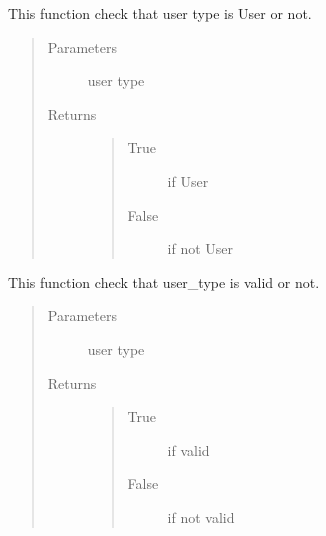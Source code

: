 \documentclass[letterpaper,10pt,english]{sphinxmanual}
\begin{document}

\begin{fulllineitems}
\label{\detokenize{janta:janta.viewhelper.is_user}}
This function check that user type is User or not.
\begin{quote}\begin{description}
\item[{Parameters}] \leavevmode
{} \textendash{} user type

\item[{Returns}] \leavevmode
\begin{quote}\begin{description}
\item[{True}] \leavevmode
if User

\item[{False}] \leavevmode
if not User

\end{description}\end{quote}


\end{description}\end{quote}

\end{fulllineitems}


\begin{fulllineitems}
\label{\detokenize{janta:janta.viewhelper.is_user_type}}
This function check that user\_type is valid or not.
\begin{quote}\begin{description}
\item[{Parameters}] \leavevmode
{} \textendash{} user type

\item[{Returns}] \leavevmode
\begin{quote}\begin{description}
\item[{True}] \leavevmode
if valid

\item[{False}] \leavevmode
if not valid

\end{description}\end{quote}


\end{description}\end{quote}

\end{fulllineitems}
\end{document}
